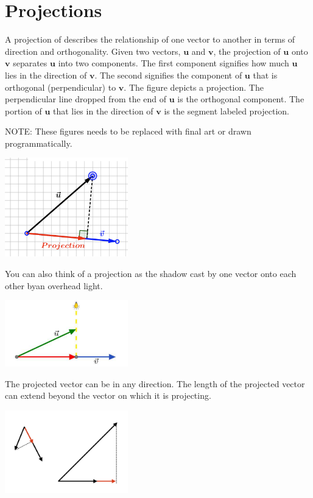 \chapter{Projections}

A projection of describes the relationship of one vector to another in terms of direction and orthogonality. Given two vectors, $\mathbf{u}$ and $\mathbf{v}$, the projection of $\mathbf{u}$ onto $\mathbf{v}$ separates $\mathbf{u}$ into two components. The first component signifies how much $\mathbf{u}$ lies in the direction of $\mathbf{v}$. The second signifies the component of $\mathbf{u}$ that is orthogonal (perpendicular) to $\mathbf{v}$.  The figure depicts a projection. The perpendicular line dropped from the end of $\mathbf{u}$ is the orthogonal component. The portion of $\mathbf{u}$ that lies in the direction of $\mathbf{v}$ is the segment labeled projection. 

NOTE: These figures needs to be replaced with final art or drawn programmatically.

\includegraphics[width=0.4\textwidth]{ProjectionFPO.png}

You can also think of a projection as the shadow cast by one vector onto each other byan overhead light.

\includegraphics[width=0.4\textwidth]{ProjectionBulbFPO.png}

The projected vector can be in any direction. The length of the projected vector can extend beyond the vector on which it is projecting.

\includegraphics[width=0.4\textwidth]{OtherExamplesFPO.png}

